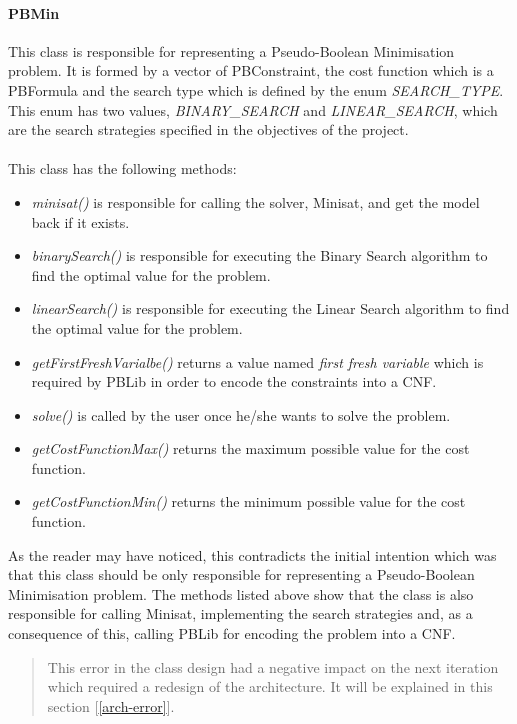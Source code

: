 


\paragraph{PBMin} 

This class is responsible for representing a Pseudo-Boolean Minimisation problem.  It is formed by a vector of PBConstraint, the cost function which is a PBFormula and the search type which is defined by the enum \emph{SEARCH\_TYPE}.  \\
This enum has two values, \emph{BINARY\_SEARCH} and \emph{LINEAR\_SEARCH}, which are the search strategies specified in the objectives of the project.  \\\\
This class has the following methods: 
\begin{itemize}
	\item \emph{minisat()} is responsible for calling the solver, Minisat, and get the model back if it exists.
	\item \emph{binarySearch()} is responsible for executing the Binary Search algorithm to find the optimal value for the problem.
	\item \emph{linearSearch()} is responsible for executing the Linear Search algorithm to find the optimal value for the problem.
	\item \emph{getFirstFreshVarialbe()} returns a value named \emph{first fresh variable} which is required by PBLib in order to encode the constraints into a CNF.
	\item \emph{solve()} is called by the user once he/she wants to solve the problem.
	\item \emph{getCostFunctionMax()} returns the maximum possible value for the cost function.
	\item \emph{getCostFunctionMin()} returns the minimum possible value for the cost function.
\end{itemize}
As the reader may have noticed, this contradicts the initial intention which was that this class should be only responsible for representing a Pseudo-Boolean Minimisation problem. The methods listed above show that the class is also responsible for calling Minisat, implementing the search strategies and, as a consequence of this, calling PBLib for encoding the problem into a CNF.  

\begin{verse}
	This error in the class design had a negative impact on the next iteration which required a redesign of the architecture. It will be explained in this section [\ref{arch-error}].
\end{verse}

